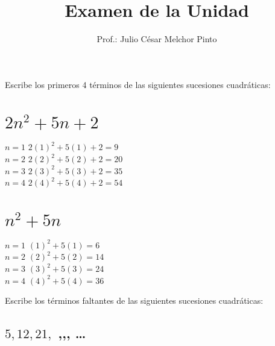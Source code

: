 \documentclass[12pt,addpoints,answers]{evalua}
\title{Examen de la Unidad}
\author{Prof.: Julio César Melchor Pinto}
\begin{document}
\begin{multicols}{2}
    
    
    
\end{multicols}
\begin{questions}
    \question[] Escribe los primeros 4 términos de las siguientes sucesiones cuadráticas:

    \begin{multicols}{2}
        \begin{parts}
            \part {\large $2n^2+5n+2$} \hfill \fillin[$9,20,35,54$][0cm]

            \begin{solutionbox}{2.5cm}
                $n=1$ \quad $2(1)^2+5(1)+2=9$ \\
                $n=2$ \quad $2(2)^2+5(2)+2=20$ \\
                $n=3$ \quad $2(3)^2+5(3)+2=35$ \\
                $n=4$ \quad $2(4)^2+5(4)+2=54$
            \end{solutionbox}

            \part {\large $n^2+5n$} \hfill \fillin[$6,14,24,36$][0cm]

            \begin{solutionbox}{2.5cm}
                $n=1$ \quad $(1)^2+5(1)=6$ \\
                $n=2$ \quad $(2)^2+5(2)=14$ \\
                $n=3$ \quad $(3)^2+5(3)=24$ \\
                $n=4$ \quad $(4)^2+5(4)=36$
            \end{solutionbox}
        \end{parts}
    \end{multicols}

    \question[] Escribe los términos faltantes de las siguientes sucesiones cuadráticas:

    \begin{multicols}{2}
        \begin{parts}
            \part {\large $5,12,21,$ \fillin[32][0.5cm],\fillin[45][0.5cm],\fillin[60][0.5cm], \dots}


\end{parts}
\end{multicols}
\end{questions}
\end{document}
